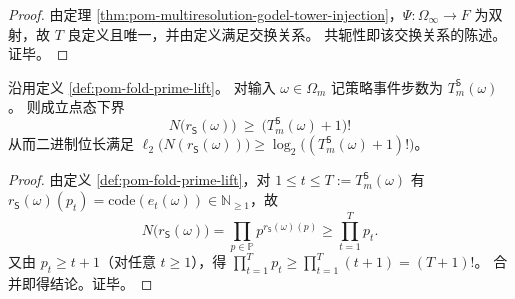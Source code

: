 \begin{proof}
由定理 \ref{thm:pom-multiresolution-godel-tower-injection}，\(\Psi:\Omega_\infty\to F\) 为双射，故 \(T\) 良定义且唯一，并由定义满足交换关系。
共轭性即该交换关系的陈述。证毕。
\end{proof}

\begin{corollary}\label{cor:pom-prime-register-godel-factorial-pointwise}
沿用定义 \ref{def:pom-fold-prime-lift}。
对输入 \(\omega\in\Omega_m\) 记策略事件步数为 \(T_m^{\mathsf S}(\omega)\)。
则成立点态下界
\[
\boxed{\;
N\!\bigl(r_{\mathsf S}(\omega)\bigr)\ \ge\ \bigl(T_m^{\mathsf S}(\omega)+1\bigr)!\;}
\]
从而二进制位长满足
\(
\ell_2\!\bigl(N(r_{\mathsf S}(\omega))\bigr)\ge \log_2\!\bigl((T_m^{\mathsf S}(\omega)+1)!\bigr)
\)。
\end{corollary}
\begin{proof}
由定义 \ref{def:pom-fold-prime-lift}，对 \(1\le t\le T:=T_m^{\mathsf S}(\omega)\) 有 \(r_{\mathsf S}(\omega)(p_t)=\mathrm{code}(e_t(\omega))\in\mathbb{N}_{\ge 1}\)，故
\[
N\!\bigl(r_{\mathsf S}(\omega)\bigr)
=\prod_{p\in\mathbb{P}}p^{r_{\mathsf S}(\omega)(p)}
\ge \prod_{t=1}^{T}p_t.
\]
又由 \(p_t\ge t+1\)（对任意 \(t\ge 1\)），得
\(
\prod_{t=1}^{T}p_t\ge \prod_{t=1}^{T}(t+1)=(T+1)!
\)。
合并即得结论。证毕。
\end{proof}

\endinput
